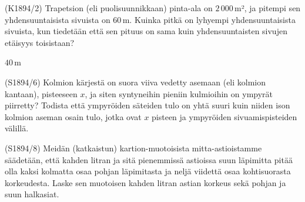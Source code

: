\begin{tehtava} 
(K1894/2) Trapetsion (eli puolisuunnikkaan) pinta-ala on $2\,000$\,m², ja pitempi sen yhdensuuntaisista sivuista on $60$\,m. Kuinka pitkä on lyhyempi yhdensuuntaisista sivuista, kun tiedetään että sen pituus on sama kuin yhdensuuntaisten sivujen etäisyys toisistaan?
  \begin{vastaus}
  $40$\,m
  \end{vastaus}
\end{tehtava}

\begin{tehtava} 
(S1894/6) Kolmion kärjestä on suora viiva vedetty asemaan (eli kolmion kantaan), pisteeseen $x$, ja siten syntyneihin pieniin kulmioihin on ympyrät piirretty? Todista että ympyröiden säteiden tulo on yhtä suuri kuin niiden ison kolmion aseman osain tulo, jotka ovat $x$ pisteen ja ympyröiden sivuamispisteiden välillä.  
\end{tehtava}

\begin{tehtava} 
(S1894/8) Meidän (katkaistun) kartion-muotoisista mitta-astioistamme säädetään, että kahden litran ja sitä pienemmissä astioissa suun läpimitta pitää olla kaksi kolmatta osaa pohjan läpimitasta ja neljä viidettä osaa kohtisuorasta korkeudesta. Laske sen muotoisen kahden litran astian korkeus sekä pohjan ja suun halkasiat.
  \begin{vastaus}
  \end{vastaus}
\end{tehtava}
